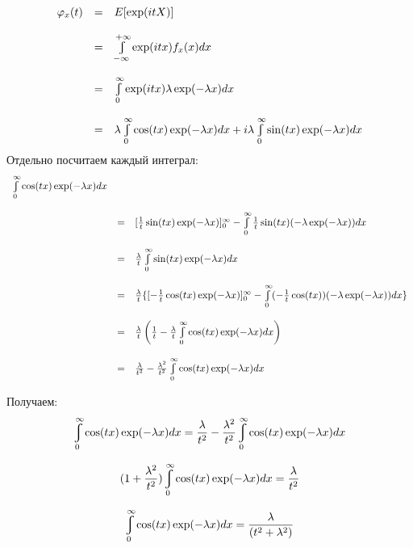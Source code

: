 \documentclass[a4paper,12pt, oneside]{book}
\let\int\varint
\begin{document}
	$$
	\begin{array}{rcl}
	\varphi_x(t) &=& E[\exp(itX)]\\
	\\
	&=&\int\limits_{-\infty}^{+\infty} \exp(itx) f_x(x)dx\\
	\\
	&=&\int\limits_0^\infty \exp(itx) \lambda \exp(-\lambda x)dx\\
	\\
	&=&\lambda \int\limits_0^\infty \cos(tx)\exp(-\lambda x)dx + i\lambda \int\limits_0^\infty \sin(tx)\exp(-\lambda x)dx
	\end{array}
	$$
	Отдельно посчитаем каждый интеграл:
	$$
	\begin{array}{rcl}
	\int\limits_0^\infty \cos(tx)\exp(-\lambda x)dx \\
	\\
	&=&[\frac{1}{t} \sin(tx) \exp(-\lambda x)]_0^\infty - \int\limits_0^\infty \frac{1}{t} \sin(tx)(-\lambda \exp(-\lambda x))dx\\
	\\
	&=&\frac{\lambda}{t} \int\limits_0^\infty \sin(tx) \exp(-\lambda x)dx\\
	\\
	&=&\frac{\lambda}{t}\{[-\frac{1}{t} \cos(tx) \exp(-\lambda x)]_0^\infty - \int\limits_0^\infty (-\frac{1}{t} \cos(tx))(-\lambda \exp(-\lambda x))dx\}\\
	\\
	&=&\frac{\lambda}{t}\left(\frac{1}{t} - \frac{\lambda}{t} \int\limits_0^\infty \cos(tx) \exp(-\lambda x)dx\right)\\
	\\
	&=&\frac{\lambda}{t^2} - \frac{\lambda ^2}{t^2} \int\limits_{0}^{\infty} \cos(tx) \exp(-\lambda x)dx
	\end{array}
	$$
	
	Получаем:
	$$
	\int\limits_0^\infty \cos(tx)\exp(-\lambda x)dx = \frac{\lambda}{t^2} - \frac{\lambda ^2}{t^2} \int\limits_{0}^{\infty} \cos(tx) \exp(-\lambda x)dx
	$$
	
	$$
	(1 + \frac{\lambda^2}{t^2})\int_0^\infty \cos(tx)\exp(-\lambda x)dx = \frac{\lambda}{t^2}
	$$
	
	$$
	\int\limits_0^\infty \cos(tx)\exp(-\lambda x)dx = \frac{\lambda}{(t^2 + \lambda^2)}
	$$
	
\end{document}
